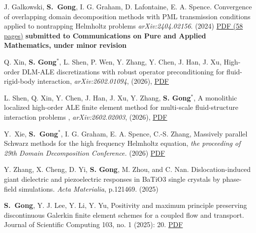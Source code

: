 \documentclass[letterpaper]{article}
\begin{document}
\begin{enumerate}[label={[\arabic*]},leftmargin=*]



\item J. Galkowski, {\bf S.~Gong}, I. G. Graham, D. Lafontaine, E. A. Spence.
Convergence of overlapping domain decomposition methods with PML transmission conditions applied to nontrapping Helmholtz problems   \emph{arXiv:2404.02156}.  (2024) \href{https://arxiv.org/abs/2404.02156}{PDF (58 pages)} {\bf submitted to Communications on Pure and Applied Mathematics, under minor revision} 

\item  Q. Xin, {\bf S. Gong}$^*$, L. Shen,  P. Wen, Y. Zhang, Y. Chen, J. Han, J. Xu, High-order DLM-ALE discretizations with robust operator preconditioning for fluid-rigid-body interaction, \emph{arXiv:2602.01094}, (2026),   \href{https://arxiv.org/abs/2602.01094}{PDF}%

\item L. Shen, Q. Xin, Y. Chen, J. Han, J. Xu, Y. Zhang, {\bf S. Gong}$^*$, A monolithic localized high-order ALE finite element method for multi-scale fluid-structure interaction problems , \emph{arXiv:2602.02003}, (2026),  \href{https://arxiv.org/abs/2602.02003}{PDF}%

\item Y.~Xie, {\bf S.~Gong}$^*$, I. G. Graham, E. A. Spence, C.-S. Zhang, Massively parallel Schwarz methods for the high frequency Helmholtz equation, \emph{the proceeding of 29th Domain
  Decomposition Conference.}  (2026) \href{https://arxiv.org/abs/2602.00735}{PDF}

\item Y. Zhang, X. Cheng, D. Yi, {\bf S. Gong}, M. Zhou, and C. Nan. Dislocation-induced giant dielectric and piezoelectric responses in BaTiO3 single crystals by phase-field simulations. \emph{Acta Materialia}, p.121469. (2025)



\item {\bf S.~Gong}, Y. J. Lee, Y. Li, Y. Yu,  Positivity and maximum principle preserving discontinuous Galerkin finite element schemes for a coupled flow and transport.  Journal of Scientific Computing 103, no. 1 (2025): 20.  \href{https://arxiv.org/abs/2405.16117}{PDF}








\end{enumerate}
\end{document}
